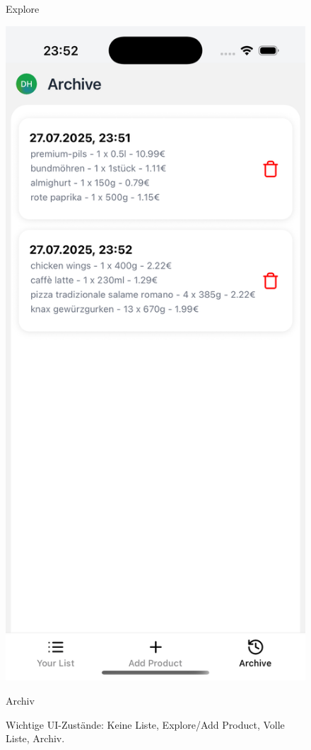 \begin{figure}[h!]
\begin{minipage}[b]{0.23\textwidth}
        \caption*{Explore}
    \end{minipage}
    \hspace{0.01\textwidth}
    \begin{minipage}[b]{0.23\textwidth}
        \includegraphics[width=\textwidth]{media/archive.png}
        \caption*{Archiv}
    \end{minipage}
    \caption{Wichtige UI-Zustände: Keine Liste, Explore/Add Product, Volle Liste, Archiv.}
\end{figure}

